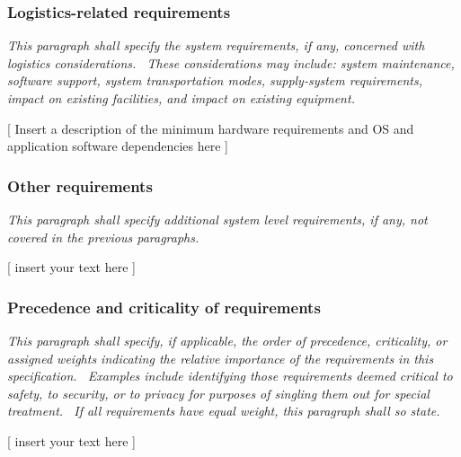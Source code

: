 \documentclass[twoside,letterpaper]{article}
\begin{document}
\subsubsection[Logistics{}-related
requirements]{\rmfamily\bfseries\color{black}
Logistics-related requirements}
{\itshape\color{black}
This paragraph shall specify the system requirements, if any, concerned
with logistics considerations. \ These considerations may include:
system maintenance, software support, system transportation modes,
supply-system requirements, impact on existing facilities, and impact
on existing equipment. \ }

{\color{black}
[ Insert a description of the minimum hardware requirements and OS and
application software dependencies here ]}

\subsubsection[]{\rmfamily\bfseries\color{black}
}
\subsubsection[Other
requirements]{\rmfamily\bfseries\color{black}
Other requirements}
{\itshape\color{black}
This paragraph shall specify additional system level requirements, if
any, not covered in the previous paragraphs.}

{\color{black}
[ insert your text here ]}

\subsubsection[Precedence and criticality of
requirements]{\rmfamily\bfseries\color{black}
Precedence and criticality of requirements}
{\itshape\color{black}
This paragraph shall specify, if applicable, the order of precedence,
criticality, or assigned weights indicating the relative importance of
the requirements in this specification. \ Examples include identifying
those requirements deemed critical to safety, to security, or to
privacy for purposes of singling them out for special treatment. \ If
all requirements have equal weight, this paragraph shall so state. }

{\color{black}
[ insert your text here ]}
\end{document}
